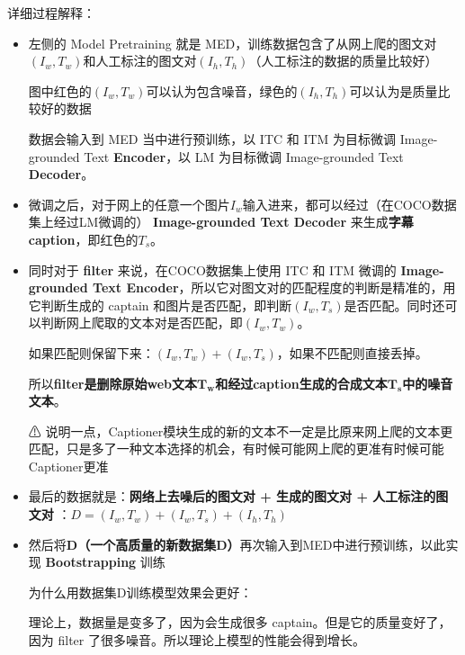 \documentclass[zihao=false,fontset=windows]{ctexart}
\newcommand{\feiEmoji}[1]{{\emojifont #1}}
\begin{document}
详细过程解释：\par
\begin{itemize}
\item 左侧的 Model Pretraining 就是 MED，训练数据包含了从网上爬的图文对$(I_w, T_w)$和人工标注的图文对$(I_h, T_h)$（人工标注的数据的质量比较好）
\begin{feishuquote}
图中\textcolor{feishuRed}{红色}的$(I_w, T_w)$可以认为包含噪音，\textcolor{feishuGreen}{绿色}的$(I_h, T_h)$可以认为是质量比较好的数据\par
\end{feishuquote}
数据会输入到 MED 当中进行预训练，以 ITC 和 ITM 为目标微调 Image-grounded Text \textbf{Encoder}，以 LM 为目标微调 Image-grounded Text\textbf{ Decoder}。
\item 微调之后，对于网上的任意一个图片$I_w$输入进来，都可以经过（在COCO数据集上经过LM微调的） \textbf{Image-grounded Text Decoder} 来生成\textcolor{feishuRed}{\textbf{字幕}} \textcolor{feishuRed}{\textbf{caption}}，即\textcolor{feishuRed}{红色}的$T_s$。
\item 同时对于 \textcolor{feishuRed}{\textbf{filter}} 来说，在COCO数据集上使用 ITC 和 ITM 微调的 \textbf{Image-grounded Text Encoder}，所以它对图文对的匹配程度的判断是精准的，用它判断生成的 captain 和图片是否匹配，即判断$(I_w, T_s)$是否匹配。同时还可以判断网上爬取的文本对是否匹配，即$(I_w, T_w)$。\par
如果匹配则保留下来：$(I_w, T_w)+(I_w, T_s)$，如果不匹配则直接丢掉。 \par
所以\textcolor{feishuRed}{\textbf{filter是删除原始web文本}}$\mathbf{T_w}$\textcolor{feishuRed}{\textbf{和经过caption生成的合成文本}}$\mathbf{T_s}$\textcolor{feishuRed}{\textbf{中的噪音文本}}。
\begin{feishuquote}
\feiEmoji{⚠} 说明一点，Captioner模块生成的新的文本不一定是比原来网上爬的文本更匹配，只是多了一种文本选择的机会，有时候可能网上爬的更准有时候可能Captioner更准\par
\end{feishuquote}
\item 最后的数据就是：\textbf{网络上去噪后的图文对 + 生成的图文对 + 人工标注的图文对 }：$D=(I_w, T_w)+(I_w, T_s)+(I_h,T_h)$
\item 然后将\textbf{D（一个高质量的新数据集D）}再次输入到MED中进行预训练，以此实现 \textcolor{feishuRed}{\textbf{Bootstrapping}} 训练
\begin{feishuquote}
为什么用数据集D训练模型效果会更好：\par
理论上，数据量是变多了，因为会生成很多 captain。但是它的质量变好了，因为 filter 了很多噪音。所以理论上模型的性能会得到增长。\par
\end{feishuquote}
\end{itemize}
\end{document}
